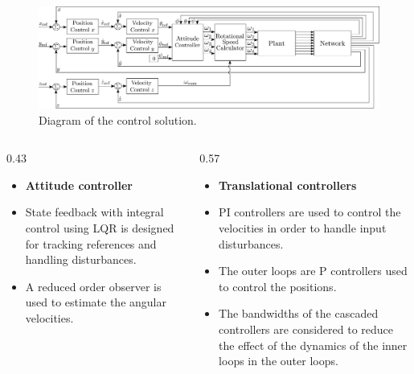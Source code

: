 \vspace{-1cm}
\begin{figure}
	\includegraphics[width=0.88\linewidth]{figures/TranslationalControlDiagram}
	\caption{Diagram of the control solution.}
\end{figure}

\begin{columns}[t,totalwidth=\twocolwid] %

	\begin{column}{0.43\twocolwid} %
  	 \centering
  	 \hspace{-2cm}
  	 \parbox{.88\textwidth}{
    	 \begin{itemize}
  	 			\item[]\textbf{Attitude controller}\\
  	 			\item State feedback with integral control using LQR is designed for tracking references and handling disturbances.
  	 			\item A reduced order observer is used to estimate the angular velocities.
  	 		\end{itemize}
  	 }
	\end{column} %
	\hspace{-4cm}
	\begin{column}{0.57\twocolwid} %
  	 \centering
   	 \parbox{1\textwidth}{
       	 \begin{itemize}
    	 			\item[]\textbf{Translational controllers}\\
     	 			\item PI controllers are used to control the velocities in order to handle input disturbances.
     	 			\item The outer loops are P controllers used to control the positions.
     	 			\item The bandwidths of the cascaded controllers are considered to reduce the effect of the dynamics of the inner loops in the outer loops.
       	 \end{itemize}		
   	 }
	\end{column} %
	\vspace{-.5cm}
\end{columns} %